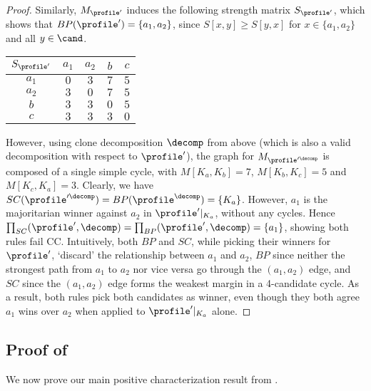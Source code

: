\begin{proof}
Similarly, $M_{\profile'}$ induces the following strength matrix $S_{\profile'}$, which shows that $BP(\profile')=\{a_1,a_2\}$, since $S[x,y] \geq S[y,x]$ for $x\in \{a_1,a_2\}$ and all $y\in \cand$. 
\begin{center}
\begin{tabular}{|c|c|c|c|c|}
    \hline
    $S_{\profile'}$ & \cellcolor{yellow!25} $a_1$ & \cellcolor{red!25} $a_2$ & \cellcolor{green!25} $b$ & \cellcolor{blue!25} $c$ \\ \hline
    \cellcolor{yellow!25} $a_1$ & $0$ & $3$ & $7$ & $5$ \\ \hline
    \cellcolor{red!25} $a_2$ & $3$ & $0$ & $7$ & $5$ \\ \hline
    \cellcolor{green!25} $b$ & $3$ & $3$ & $0$ & $5$ \\ \hline
    \cellcolor{blue!25} $c$ & $3$ & $3$ & $3$ & $0$ \\ 
    \hline
\end{tabular}
\end{center}

However, using clone decomposition $\decomp$ from above (which is also a valid decomposition with respect to $\profile'$), the graph for $M_{\profile'^\decomp}$ is composed of a single simple cycle, with $M[K_a,K_b]=7$, $M[K_b,K_c]=5$ and $M[K_c,K_a]=3$. Clearly, we have $SC(\profile'^\decomp)=BP(\profile^\decomp)=\{K_a\}$. However, $a_1$ is the majoritarian winner against $a_2$ in $\profile'|_{K_a}$, without any cycles. Hence $\prod_{SC}(\profile', \decomp)=\prod_{BP}(\profile', \decomp)=\{a_1\}$, showing both rules fail CC. Intuitively, both $BP$ and $SC$, while picking their winners for $\profile'$, `discard' the relationship between $a_1$ and $a_2$, $BP$ since neither the strongest path from $a_1$ to $a_2$ nor vice versa go through the $(a_1,a_2)$ edge, and $SC$ since the $(a_1,a_2)$ edge forms the weakest margin in a 4-candidate cycle. As a result, both rules pick both candidates as winner, even though they both agree $a_1$ wins over $a_2$ when applied to $\profile'|_{K_a}$ alone.
\end{proof}

\subsection{Proof of }\label{appsec:rpi}
We now prove our main positive characterization result from .

\rpcc*


